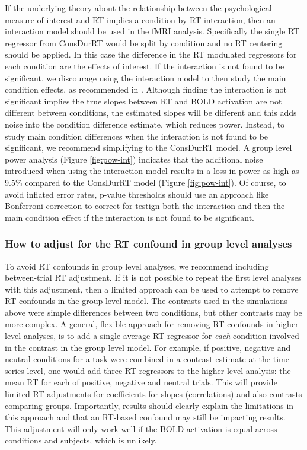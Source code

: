 \documentclass[titlepage,12pt] {article}
\begin{document}
If the underlying theory about the relationship between the psychological measure of interest and RT implies a condition by RT interaction, then an interaction model should be used in the fMRI analysis.  Specifically the single RT regressor from ConsDurRT would be split by condition and no RT centering should be applied.  In this case the difference in the RT modulated regressors for each condition are the effects of interest.  If the interaction is not found to be significant, we discourage using the interaction model to then study the main condition effects, as recommended in \citet{carp_conditional_2010}.  Although finding the interaction is not significant implies the true slopes between RT and BOLD activation are not different between conditions, the estimated slopes will be different and this adds noise into the condition difference estimate, which reduces power.  Instead, to study main condition differences when the interaction is not found to be significant, we recommend simplifying to the ConsDurRT model.  A group level power analysis (Figure \ref{fig:pow-int}) indicates that the additional noise introduced when using the interaction model results in a loss in power as high as 9.5\% compared to the ConsDurRT model (Figure \ref{fig:pow-int}).  Of course, to avoid inflated error rates, p-value thresholds should use an approach like Bonferroni correction to correct for testign both the interaction and then the main condition effect if the interaction is not found to be significant.

\subsubsection*{How to adjust for the RT confound in group level analyses}

To avoid RT confounds in group level analyses, we recommend including between-trial RT adjustment.  If it is not possible to repeat the first level analyses with this adjustment, then a limited approach can be used to attempt to remove RT confounds in the group level model.  The contrasts used in the simulations above were simple differences between two conditions, but other contrasts may be more complex.  A general, flexible approach for removing RT confounds in higher level analyses, is to  add a single average RT regressor for \emph{each} condition involved in the contrast in the group level model.  For example, if positive, negative and neutral conditions for a task were combined in a contrast estimate at the time series level, one would add three RT regressors to the higher level analysis: the mean RT for each of positive, negative and neutral trials.  This will provide limited RT adjustments for coefficients for slopes (correlations) and also contrasts comparing groups.  Importantly, results should clearly explain the limitations in this approach and that an RT-based confound may still be impacting results. This adjustment will only work well if the BOLD activation is equal across conditions and subjects, which is unlikely.
\end{document}
